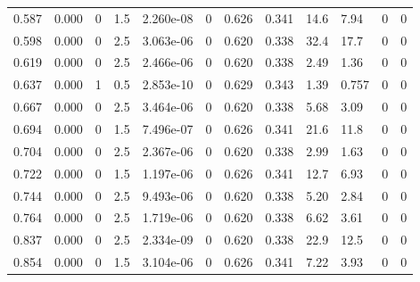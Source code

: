 \documentclass[preview]{standalone}
\begin{document}
{{\begin{tabular}{L{1.2cm}C{1.2cm} C{0.3cm}C{0.5cm} C{1.4cm}C{1.4cm} C{1.4cm}C{1.4cm} C{1.6cm}C{1.6cm} C{1.6cm}C{1.6cm}}
  0.587  &  0.000  & 0     & 1.5 &  2.260e-08  & 0  &  0.626&   0.341& 14.6 & 7.94   &  0 & 0  \\ 
  0.598  &  0.000  & 0     & 2.5 &  3.063e-06  & 0  &  0.620&   0.338& 32.4 & 17.7   &  0 & 0  \\ 
  0.619  &  0.000  & 0     & 2.5 &  2.466e-06  & 0  &  0.620&   0.338& 2.49 & 1.36   &  0 & 0  \\ 
  0.637  &  0.000  & 1     & 0.5 &  2.853e-10  & 0  &  0.629&   0.343& 1.39 & 0.757   &  0 & 0  \\ 
  0.667  &  0.000  & 0     & 2.5 &  3.464e-06  & 0  &  0.620&   0.338& 5.68 & 3.09   &  0 & 0  \\ 
  0.694  &  0.000  & 0     & 1.5 &  7.496e-07  & 0  &  0.626&   0.341& 21.6 & 11.8   &  0 & 0  \\ 
  0.704  &  0.000  & 0     & 2.5 &  2.367e-06  & 0  &  0.620&   0.338& 2.99 & 1.63   &  0 & 0  \\ 
  0.722  &  0.000  & 0     & 1.5 &  1.197e-06  & 0  &  0.626&   0.341& 12.7 & 6.93   &  0 & 0  \\ 
  0.744  &  0.000  & 0     & 2.5 &  9.493e-06  & 0  &  0.620&   0.338& 5.20 & 2.84   &  0 & 0  \\ 
  0.764  &  0.000  & 0     & 2.5 &  1.719e-06  & 0  &  0.620&   0.338& 6.62 & 3.61   &  0 & 0  \\ 
  0.837  &  0.000  & 0     & 2.5 &  2.334e-09  & 0  &  0.620&   0.338& 22.9 & 12.5   &  0 & 0  \\ 
  0.854  &  0.000  & 0     & 1.5 &  3.104e-06  & 0  &  0.626&   0.341& 7.22 & 3.93   &  0 & 0  \\ 
\hline 
\end{tabular} 

}}
\end{document}
